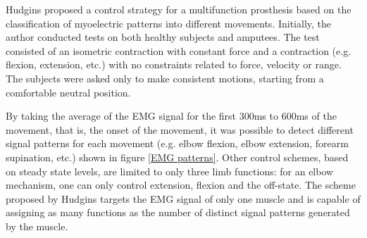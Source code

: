      Hudgins \cite{Hudgins204774} proposed a control strategy for a multifunction prosthesis based on the classification of myoelectric patterns into different movements. Initially, the author conducted tests on both healthy subjects and amputees. The test consisted of an isometric contraction with constant force and a contraction (e.g. flexion, extension, etc.) with no constraints related to force, velocity or range. The subjects were asked only to make consistent motions, starting from a comfortable neutral position.
     
     By taking the average of the EMG signal for the first 300ms to 600ms of the movement, that is, the onset of the movement, it was possible to detect different signal patterns for each movement (e.g. elbow flexion, elbow extension, forearm supination, etc.) shown in figure \ref{EMG patterns}. Other control schemes, based on steady state levels, are limited to only three limb functions: for an elbow mechanism, one can only control extension, flexion and the off-state. The scheme proposed by Hudgins targets the EMG signal of only one muscle and is capable of assigning as many functions as the number of distinct signal patterns generated by the muscle.
     

